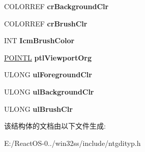 \begin{DoxyCompactItemize}
\item 
\mbox{\label{struct___g_d_i_b_s_p_a_t_b_l_t_a0e82738a67e0a4d9b521f07edf048f45}} 
C\+O\+L\+O\+R\+R\+EF {\bfseries cr\+Background\+Clr}
\item 
\mbox{\label{struct___g_d_i_b_s_p_a_t_b_l_t_a801553a5b1ce2c9d2f40335006627280}} 
C\+O\+L\+O\+R\+R\+EF {\bfseries cr\+Brush\+Clr}
\item 
\mbox{\label{struct___g_d_i_b_s_p_a_t_b_l_t_abd86610e2db4332e31920e3b2c3c1dbe}} 
I\+NT {\bfseries Icm\+Brush\+Color}
\item 
\mbox{\label{struct___g_d_i_b_s_p_a_t_b_l_t_a69545e4a10e515f84916bbd19094204e}} 
\hyperlink{struct___p_o_i_n_t_l}{P\+O\+I\+N\+TL} {\bfseries ptl\+Viewport\+Org}
\item 
\mbox{\label{struct___g_d_i_b_s_p_a_t_b_l_t_a2b13c5d1dff8172716ef47b5c9140c9b}} 
U\+L\+O\+NG {\bfseries ul\+Foreground\+Clr}
\item 
\mbox{\label{struct___g_d_i_b_s_p_a_t_b_l_t_aace10b81bdb35e6f1600fd253eb092c4}} 
U\+L\+O\+NG {\bfseries ul\+Background\+Clr}
\item 
\mbox{\label{struct___g_d_i_b_s_p_a_t_b_l_t_a0842a7577621113efa05f2808d6ba767}} 
U\+L\+O\+NG {\bfseries ul\+Brush\+Clr}
\end{DoxyCompactItemize}


该结构体的文档由以下文件生成\+:\begin{DoxyCompactItemize}
\item 
E\+:/\+React\+O\+S-\/0../win32ss/include/ntgdityp.\+h\end{DoxyCompactItemize}
